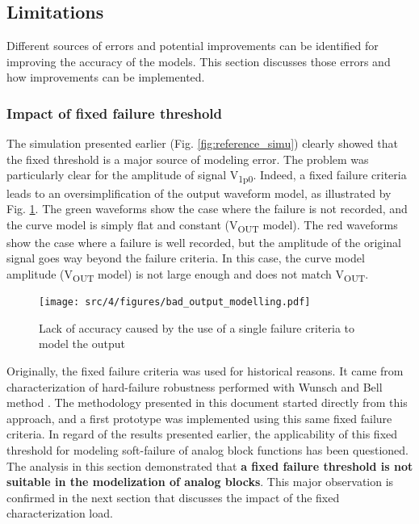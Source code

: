\subsection{Limitations}
\label{sec:current-limitations}

Different sources of errors and potential improvements can be identified for improving the accuracy of the models.
This section discusses those errors and how improvements can be implemented.

\subsubsection{Impact of fixed failure threshold}
\label{sec:fixed-failure-threshold}

The simulation presented earlier (Fig. \ref{fig:reference_simu}) clearly showed that the fixed threshold is a major source of modeling error.
The problem was particularly clear for the amplitude of signal V\textsubscript{1p0}.
Indeed, a fixed failure criteria leads to an oversimplification of the output waveform model, as illustrated by Fig. \ref{fig:impact-single-failure-criteria}.
The green waveforms show the case where the failure is not recorded, and the curve model is simply flat and constant (V\textsubscript{OUT} model).
The red waveforms show the case where a failure is well recorded, but the amplitude of the original signal goes way beyond the failure criteria.
In this case, the curve model amplitude (V\textsubscript{OUT} model) is not large enough and does not match V\textsubscript{OUT}.

\begin{figure}[!h]
  \centering
  \texttt{[image: src/4/figures/bad\_output\_modelling.pdf]}
  \caption{Lack of accuracy caused by the use of a single failure criteria to model the output}
  \label{fig:impact-single-failure-criteria}
\end{figure}

%
Originally, the fixed failure criteria was used for historical reasons.
It came from characterization of hard-failure robustness performed with Wunsch and Bell method \cite{wunsch-bell}.
The methodology presented in this document started directly from this approach, and a first prototype was implemented using this same fixed failure criteria.
In regard of the results presented earlier, the applicability of this fixed threshold for modeling soft-failure of analog block functions has been questioned.
The analysis in this section demonstrated that \textbf{a fixed failure threshold is not suitable in the modelization of analog blocks}.
This major observation is confirmed in the next section that discusses the impact of the fixed characterization load.

